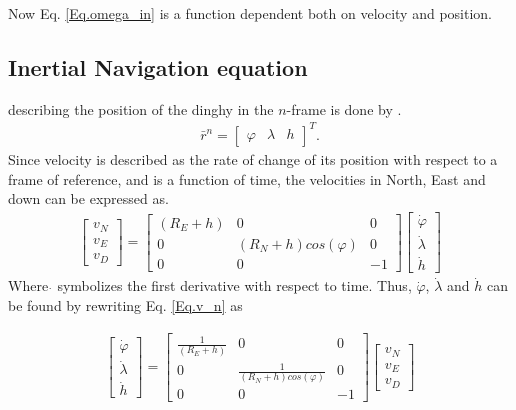 Now Eq. \eqref{Eq.omega_in} is a function dependent both on velocity and position.

\subsection*{Inertial Navigation equation}
describing the position of the dinghy in the $n$-frame is done by \cite{nonlinear}.
\begin{align}
\bar{r}^n=
\begin{bmatrix}
\varphi & \lambda & h
\end{bmatrix}^T.
\end{align}
Since velocity is described as the rate of change of its position with respect to a frame of reference, and is a function of time, the velocities in North, East and down can be expressed as.
\begin{align}
\begin{bmatrix}
v_N \\
v_E \\
v_D
\end{bmatrix}
=
\begin{bmatrix}
(R_E+h) & 0 & 0 \\
0 & (R_N+h)cos(\varphi) & 0\\
0 & 0 & -1
\end{bmatrix}
\begin{bmatrix}
\dot{\varphi}\\
\dot{\lambda}\\
\dot{h}
\end{bmatrix}
\label{Eq.v_n}
\end{align}
Where $\dot{}$ symbolizes the first derivative with respect to time. Thus, $\dot{\varphi}$, $\dot{\lambda}$ and $\dot{h}$ can be found by rewriting Eq. \eqref{Eq.v_n} as

\begin{align}
\begin{bmatrix}
\dot{\varphi}\\
\dot{\lambda}\\
\dot{h}
\end{bmatrix}
=
\begin{bmatrix}
\frac{1}{(R_E+h)} & 0 & 0 \\
0 & \frac{1}{(R_N+h)cos(\varphi)} & 0\\
0 & 0 & -1
\end{bmatrix}
\begin{bmatrix}
v_N \\
v_E \\
v_D
\end{bmatrix}
\label{Eq.v_n}
\end{align}


